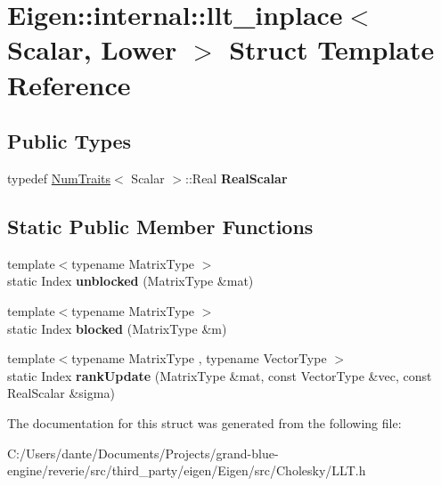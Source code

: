 \hypertarget{struct_eigen_1_1internal_1_1llt__inplace_3_01_scalar_00_01_lower_01_4}{}\section{Eigen\+::internal\+::llt\+\_\+inplace$<$ Scalar, Lower $>$ Struct Template Reference}
\label{struct_eigen_1_1internal_1_1llt__inplace_3_01_scalar_00_01_lower_01_4}
\subsection*{Public Types}
\begin{DoxyCompactItemize}
\item 
\mbox{\label{struct_eigen_1_1internal_1_1llt__inplace_3_01_scalar_00_01_lower_01_4_a740535ced836b91d158c77b72223324d}} 
typedef \mbox{\hyperlink{struct_eigen_1_1_num_traits}{Num\+Traits}}$<$ Scalar $>$\+::Real {\bfseries Real\+Scalar}
\end{DoxyCompactItemize}
\subsection*{Static Public Member Functions}
\begin{DoxyCompactItemize}
\item 
\mbox{\label{struct_eigen_1_1internal_1_1llt__inplace_3_01_scalar_00_01_lower_01_4_ac9fa1e5e9b89b26532f6a6809ab33c4e}} 
{\footnotesize template$<$typename Matrix\+Type $>$ }\\static Index {\bfseries unblocked} (Matrix\+Type \&mat)
\item 
\mbox{\label{struct_eigen_1_1internal_1_1llt__inplace_3_01_scalar_00_01_lower_01_4_a88a62e53c6984ed5e0512a04b637b5b7}} 
{\footnotesize template$<$typename Matrix\+Type $>$ }\\static Index {\bfseries blocked} (Matrix\+Type \&m)
\item 
\mbox{\label{struct_eigen_1_1internal_1_1llt__inplace_3_01_scalar_00_01_lower_01_4_ae02f3e4d3e4abf21624333d43762dd81}} 
{\footnotesize template$<$typename Matrix\+Type , typename Vector\+Type $>$ }\\static Index {\bfseries rank\+Update} (Matrix\+Type \&mat, const Vector\+Type \&vec, const Real\+Scalar \&sigma)
\end{DoxyCompactItemize}


The documentation for this struct was generated from the following file\+:\begin{DoxyCompactItemize}
\item 
C\+:/\+Users/dante/\+Documents/\+Projects/grand-\/blue-\/engine/reverie/src/third\+\_\+party/eigen/\+Eigen/src/\+Cholesky/L\+L\+T.\+h\end{DoxyCompactItemize}
